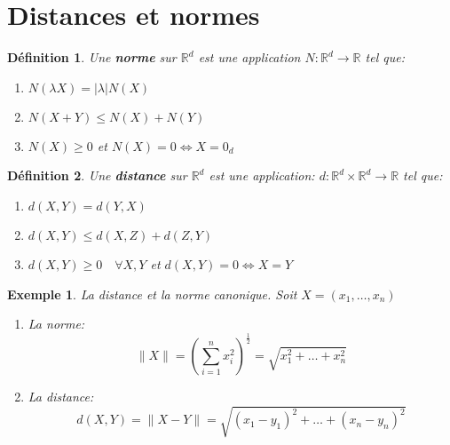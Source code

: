 \documentclass[a4paper]{article}
\newcommand{\R}{\mathbb{R}}
\newtheorem{definition}{Définition}[section]
\newtheorem{exemple}{Exemple}[section]
\begin{document}
\section{Distances et normes}
   \begin{definition}
       Une \textbf{norme} sur $\R^d$ est une application $N: \R^d \to \R$ tel que:
       \begin{enumerate}
           \item $N(\lambda X) = |\lambda|N(X)$
           \item  $N(X + Y) \le N(X) + N(Y)$
           \item $N(X) \ge 0$ et $N(X) = 0 \iff X = 0_d$
       \end{enumerate}
   \end{definition} 
   \begin{definition}
       Une \textbf{distance} sur $\R^d$ est une application:  $d: \R^d \times \R^d \to \R$ tel que:
       \begin{enumerate}
           \item $d(X, Y) = d(Y, X)$
           \item  $d(X, Y) \le d(X, Z) + d(Z, Y)$
           \item $d(X, Y) \ge 0 \quad \forall X,Y$ et $d(X,Y) = 0 \iff X = Y$
       \end{enumerate}
   \end{definition}
   \begin{exemple} La distance et la norme canonique. Soit $X = (x_1, \ldots, x_n)$
      \begin{enumerate}
          \item La norme:
            \[
                \|X\| = \left( \sum_{i=1}^{n} x_i^2 \right)^{\frac{1}{2}}  = \sqrt{x_1^2 + \ldots + x_n^2} 
            \]               
        \item La distance: 
            \[
                d(X, Y) = \|X - Y\| = \sqrt{(x_1 - y_1)^2 + \ldots + (x_n - y_n)^2 } 
            \] 

      \end{enumerate} 
   \end{exemple}
\end{document}
